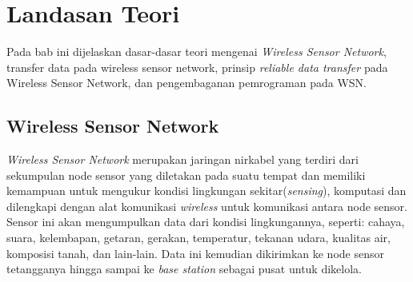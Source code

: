 \chapter{Landasan Teori}
\label{chap:teori}
Pada bab ini dijelaskan dasar-dasar teori mengenai \textit{Wireless Sensor Network}, transfer data pada wireless sensor network, prinsip \textit{reliable data transfer} pada Wireless Sensor Network, dan pengembaganan pemrograman pada WSN.

\section{Wireless Sensor Network}
\label{sec:wsn}
\textit{Wireless Sensor Network} merupakan jaringan nirkabel yang terdiri dari sekumpulan node sensor yang diletakan pada suatu tempat dan memiliki kemampuan untuk mengukur kondisi lingkungan sekitar(\textit{sensing}), komputasi dan dilengkapi dengan alat komunikasi \textit{wireless} untuk komunikasi antara node sensor. Sensor ini akan mengumpulkan data dari kondisi lingkungannya, seperti: cahaya, suara, kelembapan, getaran, gerakan, temperatur, tekanan udara, kualitas air, komposisi tanah, dan lain-lain. Data ini kemudian dikirimkan ke node sensor tetangganya hingga sampai ke \textit{base station} sebagai pusat untuk dikelola.

